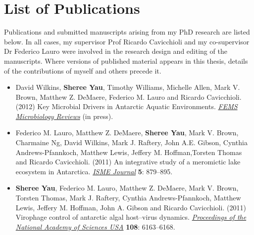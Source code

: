 \chapter*{List of Publications}
Publications and submitted manuscripts arising from my PhD research are listed below.
In all cases, my supervisor Prof Ricardo Cavicchioli and my co-supervisor Dr Federico Lauro were
involved in the research design and editing of the manuscripts.
Where versions of published material appears in this thesis, details of the contributions of 
myself and others precede it.

\begin{itemize}

\item David Wilkins, \textbf{Sheree Yau}, Timothy Williams, Michelle Allen, Mark V. Brown, 
Matthew Z. DeMaere, Federico M. Lauro and Ricardo Cavicchioli. (2012)
Key Microbial Drivers in Antarctic Aquatic Environments.
\textit{\underline{FEMS Microbiology Reviews}}
(in press).

\item Federico M. Lauro, Matthew Z. DeMaere, \textbf{Sheree Yau}, Mark V. Brown, Charmaine Ng, 
David Wilkins, Mark J. Raftery, John A.E. Gibson, Cynthia Andrews-Pfannkoch, Matthew Lewis, 
Jeffery M. Hoffman,Torsten Thomas and Ricardo Cavicchioli. (2011)
An integrative study of a meromictic lake ecosystem in Antarctica. 
\textit{\underline{ISME Journal}}
\textbf{5}: 879--895.

\item \textbf{Sheree Yau}, Federico M. Lauro, Matthew Z. DeMaere, Mark V. Brown, Torsten Thomas, 
Mark J. Raftery, Cynthia Andrews-Pfannkoch, Matthew Lewis, Jeffery M. Hoffman, John A. Gibson and 
Ricardo Cavicchioli. (2011)
Virophage control of antarctic algal host--virus dynamics. 
\textit{\underline{Proceedings of the National Academy of Sciences USA}}
\textbf{108}: 6163--6168.

\end{itemize}

